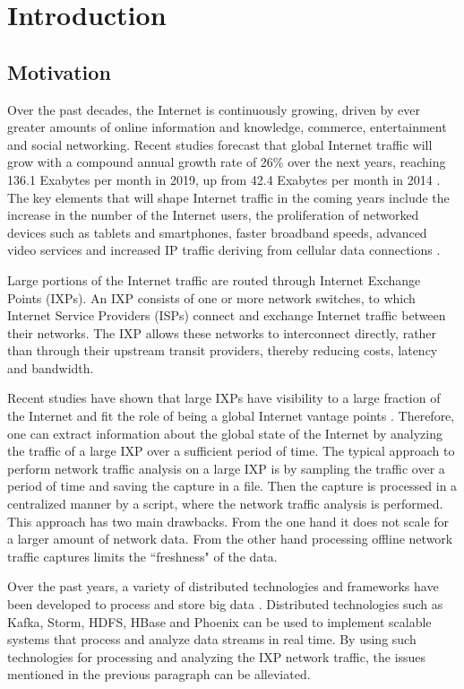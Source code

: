 \chapter{Introduction}\label{chapter:introduction}

\section{Motivation}

Over the past decades, the Internet is continuously growing, driven by ever greater amounts of online information and knowledge, commerce, entertainment and social networking. Recent studies forecast that global Internet traffic will grow with a compound annual growth rate of 26\% over the next years, reaching 136.1 Exabytes per month in 2019, up from 42.4 Exabytes per month in 2014 \cite{cisco_2014}. The key elements that will shape Internet traffic in the coming years include the increase in the number of the Internet users, the proliferation of networked devices such as tablets and smartphones, faster broadband speeds, advanced video services and increased IP traffic deriving from cellular data connections \cite{cisco_press}.

Large portions of the Internet traffic are routed through Internet Exchange Points (IXPs). An IXP consists of one or more network switches, to which Internet Service Providers (ISPs) connect and exchange Internet traffic between their networks. The IXP allows these networks to interconnect directly, rather than through their upstream transit providers, thereby reducing costs, latency and bandwidth. 

Recent studies have shown that large IXPs have visibility to a large fraction of the Internet and fit the role of being a global Internet vantage points \cite{smaragdakis}. Therefore, one can extract information about the global state of the Internet by analyzing the traffic of a large IXP over a sufficient period of time. The typical approach to perform network traffic analysis on a large IXP is by sampling the traffic over a period of time and saving the capture in a file. Then the capture is processed in a centralized manner by a script, where the network traffic analysis is performed. This approach has two main drawbacks. From the one hand it does not scale for a larger amount of network data. From the other hand processing offline network traffic captures limits the ``freshness" of the data.

Over the past years, a variety of distributed technologies and frameworks have been developed to process and store big data \cite{hadoop,storm,hbase}. Distributed technologies such as Kafka, Storm, HDFS, HBase and Phoenix can be used to implement scalable systems that process and analyze data streams in real time. By using such technologies for processing and analyzing the IXP network traffic, the issues mentioned in the previous paragraph can be alleviated. 


